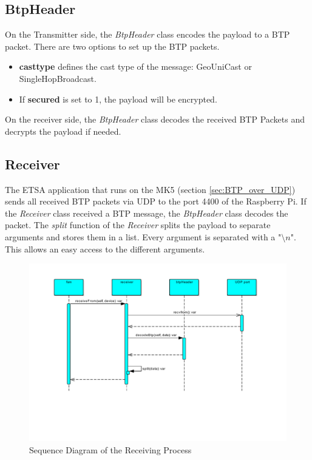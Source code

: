\subsection{BtpHeader}

On the Transmitter side, the \textit{BtpHeader} class encodes the payload to a BTP packet. There are two options to set up the BTP packets. 
\begin{itemize}
	\item \textbf{casttype} defines the cast type of the message: GeoUniCast or SingleHopBroadcast.
	\item If \textbf{secured} is set to 1, the payload will be encrypted.
\end{itemize}
On the receiver side, the \textit{BtpHeader} class decodes the received BTP Packets and decrypts the payload if needed.

\subsection{Receiver}

The ETSA application that runs on the MK5 (section \ref{sec:BTP_over_UDP}) sends all received BTP packets via UDP to the port 4400 of the Raspberry Pi. If the \textit{Receiver} class received a BTP message, the \textit{BtpHeader} class decodes the packet. The \textit{split} function of the \textit{Receiver} splits the payload to separate arguments and stores them in a list. Every argument is separated with a "$\setminus n$". This allows an easy access to the different arguments.

\begin{figure}[htb]
	\centering
	\includegraphics[width=1\textwidth]{images/Receive}
	\caption{Sequence Diagram of the Receiving Process}
	\label{fig:sequence_diagram_receive}
\end{figure}

